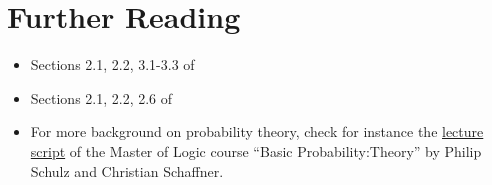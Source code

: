 \section{Further Reading}
\begin{itemize}
\item Sections 2.1, 2.2, 3.1-3.3 of \CF
\item Sections 2.1, 2.2, 2.6 of \CT
\item For more background on probability theory, check for instance the \href{https://github.com/BasicProbability/LectureNotes/raw/master/fullscript/BasicProbabilityAndStatistics.pdf}{lecture
  script} of the Master of Logic course ``Basic Probability:Theory''
by Philip Schulz and Christian Schaffner.
\end{itemize}



